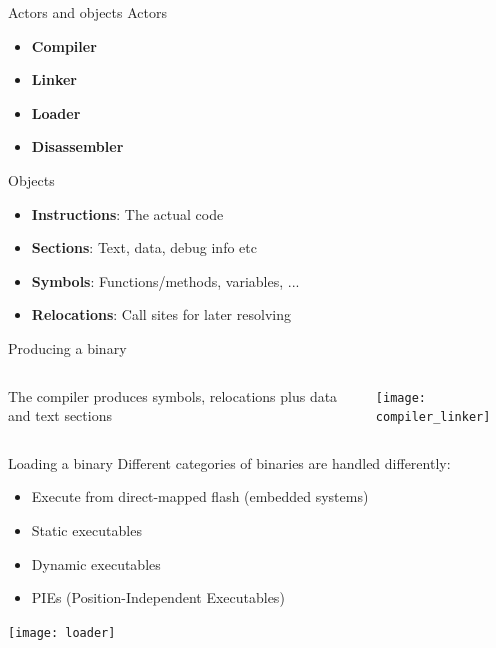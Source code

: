 \documentclass{beamer}
\begin{document}
\begin{frame}{Actors and objects}
  Actors
  \begin{itemize}
    \item \textbf{Compiler}
    \item \textbf{Linker}
    \item \textbf{Loader}
    \item \textbf{Disassembler}
  \end{itemize}
  Objects
  \begin{itemize}
    \item \textbf{Instructions}: The actual code
    \item \textbf{Sections}: Text, data, debug info etc
    \item \textbf{Symbols}: Functions/methods, variables, ...
    \item \textbf{Relocations}: Call sites for later resolving
  \end{itemize}

\end{frame}



\begin{frame}{Producing a binary}
  \begin{columns}
    \begin{column}{0.5\textwidth}
      The compiler produces symbols, relocations plus data and text sections
    \end{column}
    \begin{column}{0.5\textwidth}
      \texttt{[image: compiler\_linker]}
    \end{column}
  \end{columns}
\end{frame}

\begin{frame}{Loading a binary}
  Different categories of binaries are handled differently:
  \begin{itemize}
    \item Execute from direct-mapped flash (embedded systems)
    \item Static executables
    \item Dynamic executables
    \item PIEs (Position-Independent Executables)
  \end{itemize}

  \texttt{[image: loader]}
\end{frame}
\end{document}
